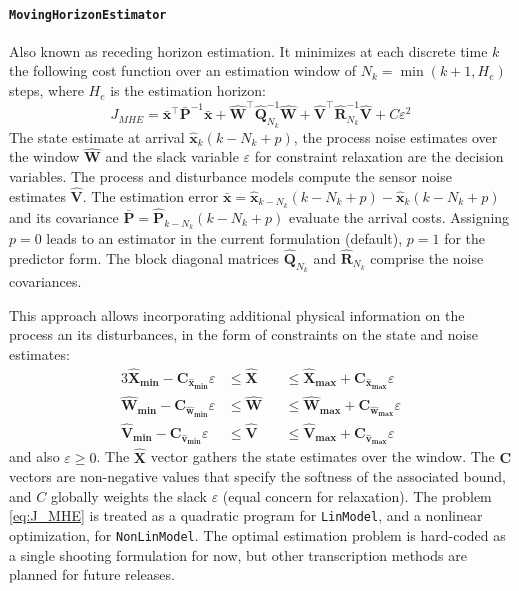\paragraph{\textnormal{\texttt{MovingHorizonEstimator}}}
Also known as receding horizon estimation. It minimizes at each discrete time $k$ the following cost function over an estimation window of $N_k = \min(k+1, H_e)$ steps, where $H_e$ is the estimation horizon:
\begin{equation}\label{eq:J_MHE}
    J_{\mathit{MHE}} = \bar{\mathbf{x}}^\intercal \bar{\mathbf{P}}^{-1} \bar{\mathbf{x}} 
    + \mathbf{\hat{W}}^\intercal \mathbf{\hat{Q}}_{N_k}^{-1} \mathbf{\hat{W}}  
    + \mathbf{\hat{V}}^\intercal \mathbf{\hat{R}}_{N_k}^{-1} \mathbf{\hat{V}}
    + C \varepsilon^2
\end{equation}
The state estimate at arrival $\mathbf{\hat{x}}_k(k-N_k+p)$, the process noise estimates over the window $\mathbf{\hat{W}}$ and the slack variable $\varepsilon$ for constraint relaxation are the decision variables. The process and disturbance models compute the sensor noise estimates $\mathbf{\hat{V}}$. The estimation error $\bar{\mathbf{x}} = \mathbf{\hat{x}}_{k-N_k}(k-N_k+p) - \mathbf{\hat{x}}_{k}(k-N_k+p)$ and its covariance $\bar{\mathbf{P}} = \mathbf{\hat{P}}_{k-N_k}(k-N_k+p)$ evaluate the arrival costs. Assigning $p=0$ leads to an estimator in the current formulation (default), $p=1$ for the predictor form. The block diagonal matrices $\mathbf{\hat{Q}}_{N_k}$ and $\mathbf{\hat{R}}_{N_k}$ comprise the noise covariances.

This approach allows incorporating additional physical information on the process an its disturbances, in the form of constraints on the state and noise estimates:
\begin{alignat}{3}
    \mathbf{\hat{X}_{min} - C_{\hat{x}_{min}}} \varepsilon &\le \mathbf{\hat{X}} &&\le \mathbf{\hat{X}_{max} + C_{\hat{x}_{max}}} \varepsilon \\
    \mathbf{\hat{W}_{min} - C_{\hat{w}_{min}}} \varepsilon &\le \mathbf{\hat{W}} &&\le \mathbf{\hat{W}_{max} + C_{\hat{w}_{max}}} \varepsilon \\
    \mathbf{\hat{V}_{min} - C_{\hat{v}_{min}}} \varepsilon &\le \mathbf{\hat{V}} &&\le \mathbf{\hat{V}_{max} + C_{\hat{v}_{max}}} \varepsilon
\end{alignat}
and also $\varepsilon \ge 0$. The $\mathbf{\hat{X}}$ vector gathers the state estimates over the window. The $\mathbf{C}$ vectors are non-negative values that specify the softness of the associated bound, and $C$ globally weights the slack $\varepsilon$ (equal concern for relaxation). The problem \eqref{eq:J_MHE} is treated as a quadratic program for \texttt{LinModel}, and a nonlinear optimization, for \texttt{NonLinModel}. The optimal estimation problem is hard-coded as a single shooting formulation for now, but other transcription methods are planned for future releases.

